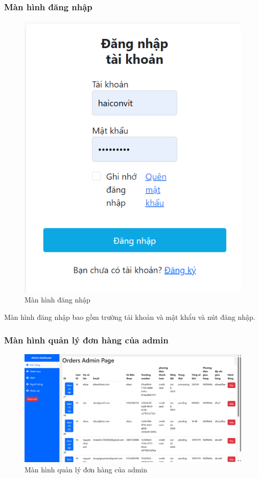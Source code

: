 \documentclass[../DoAn.tex]{subfiles}
\begin{document}
\subsubsection{Màn hình đăng nhập}
\begin{figure}[H]
    \centering
    \includegraphics[width=1\textwidth]{Hinhve/đang nhập.png}
    \caption{Màn hình đăng nhập}
    \label{fig:visual sign in}
\end{figure}

Màn hình đăng nhập bao gồm trường tải khoản và mật khẩu và nút đăng nhập.

\subsubsection{Màn hình quản lý đơn hàng của admin}
\begin{figure}[H]
    \centering
    \includegraphics[width=1\linewidth]{Hinhve/order admin.png}
    \caption{Màn hình quản lý đơn hàng của admin}
    \label{fig:visual order admin}
\end{figure}
\end{document}

